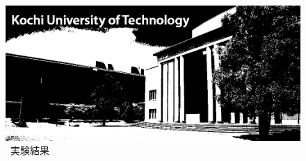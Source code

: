 \begin{figure}[H]
\begin{minipage}[b]{.23\textwidth}
    \end{minipage}
    \begin{minipage}[b]{.23\textwidth}
        \centering
        \includegraphics[keepaspectratio,width=\textwidth]{../../Figures/05_24_1bit.png}
    \end{minipage}
    \caption{\kadaiab\ 実験結果}
\end{figure}
